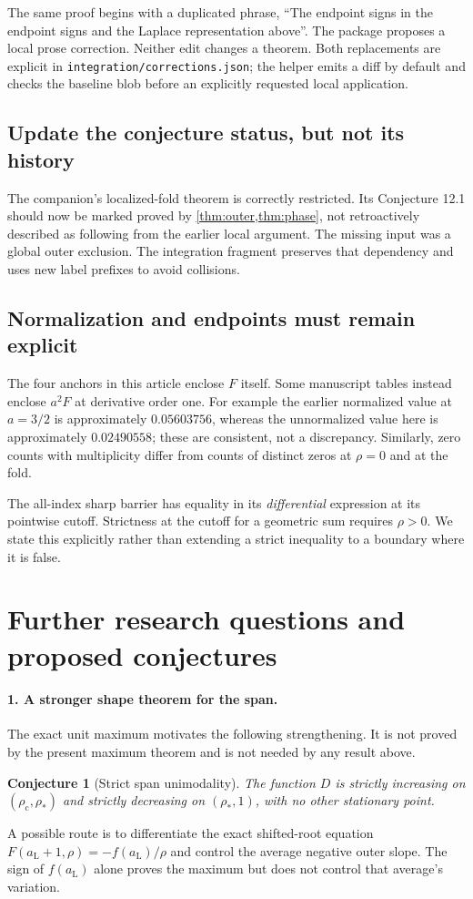 \documentclass[11pt]{article}
\numberwithin{equation}{section}
\newtheorem{conjecture}[conjecture]{Conjecture}
\theoremstyle{definition}
\newcommand{\lc}{\rho_{\mathrm c}}
\newcommand{\rs}{\rho_*}
\newcommand{\aL}{a_{\mathrm L}}
\begin{document}
The same proof begins with a duplicated phrase, ``The endpoint signs in
the endpoint signs and the Laplace representation above''. The package
proposes a local prose correction. Neither edit changes a theorem.
Both replacements are explicit in \texttt{integration/corrections.json};
the helper emits a diff by default and checks the baseline blob before
an explicitly requested local application.

\subsection{Update the conjecture status, but not its history}
The companion's localized-fold theorem is correctly restricted. Its
Conjecture 12.1 should now be marked proved by \cref{thm:outer,thm:phase},
not retroactively described as following from the earlier local argument.
The missing input was a global outer exclusion. The integration fragment
preserves that dependency and uses new label prefixes to avoid collisions.

\subsection{Normalization and endpoints must remain explicit}
The four anchors in this article enclose $F$ itself. Some manuscript tables
instead enclose $a^2F$ at derivative order one. For example the earlier
normalized value at $a=3/2$ is approximately $0.05603756$, whereas the
unnormalized value here is approximately $0.02490558$; these are consistent,
not a discrepancy. Similarly, zero counts with multiplicity differ from
counts of distinct zeros at $\rho=0$ and at the fold.

The all-index sharp barrier has equality in its \emph{differential}
expression at its pointwise cutoff. Strictness at the cutoff for a
geometric sum requires $\rho>0$. We state this explicitly rather than
extending a strict inequality to a boundary where it is false.

\section{Further research questions and proposed conjectures}
\label{sec:questions}
\paragraph{1. A stronger shape theorem for the span.}
The exact unit maximum motivates the following strengthening. It is not
proved by the present maximum theorem and is not needed by any result above.
\begin{conjecture}[Strict span unimodality]\label{conj:span}
The function $D$ is strictly increasing on $(\lc,\rs)$ and strictly
decreasing on $(\rs,1)$, with no other stationary point.
\end{conjecture}
A possible route is to differentiate the exact shifted-root equation
$F(\aL+1,\rho)=-f(\aL)/\rho$ and control the average negative outer slope.
The sign of $f(\aL)$ alone proves the maximum but does not control that
average's variation.
\end{document}
